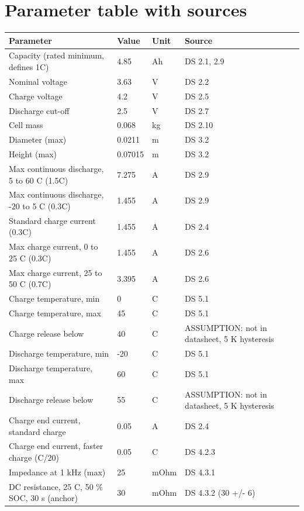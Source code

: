 \documentclass[11pt,a4paper]{article}
\begin{document}
\appendix
\section{Parameter table with sources}
\begin{longtable}{@{}p{4.3cm}p{2.7cm}p{1.6cm}p{6.2cm}@{}}
\toprule
Parameter & Value & Unit & Source \\
\midrule
\endhead
Capacity (rated minimum, defines 1C) & 4.85 & Ah & DS 2.1, 2.9 \\
Nominal voltage & 3.63 & V & DS 2.2 \\
Charge voltage & 4.2 & V & DS 2.5 \\
Discharge cut-off & 2.5 & V & DS 2.7 \\
Cell mass & 0.068 & kg & DS 2.10 \\
Diameter (max) & 0.0211 & m & DS 3.2 \\
Height (max) & 0.07015 & m & DS 3.2 \\
Max continuous discharge, 5 to 60 C (1.5C) & 7.275 & A & DS 2.9 \\
Max continuous discharge, -20 to 5 C (0.3C) & 1.455 & A & DS 2.9 \\
Standard charge current (0.3C) & 1.455 & A & DS 2.4 \\
Max charge current, 0 to 25 C (0.3C) & 1.455 & A & DS 2.6 \\
Max charge current, 25 to 50 C (0.7C) & 3.395 & A & DS 2.6 \\
Charge temperature, min & 0 & C & DS 5.1 \\
Charge temperature, max & 45 & C & DS 5.1 \\
Charge release below & 40 & C & ASSUMPTION: not in datasheet, 5 K hysteresis \\
Discharge temperature, min & -20 & C & DS 5.1 \\
Discharge temperature, max & 60 & C & DS 5.1 \\
Discharge release below & 55 & C & ASSUMPTION: not in datasheet, 5 K hysteresis \\
Charge end current, standard charge & 0.05 & A & DS 2.4 \\
Charge end current, faster charge (C/20) & 0.05 & C & DS 4.2.3 \\
Impedance at 1 kHz (max) & 25 & mOhm & DS 4.3.1 \\
DC resistance, 25 C, 50 \% SOC, 30 s (anchor) & 30 & mOhm & DS 4.3.2 (30 +/- 6) \\

\end{longtable}
\end{document}
